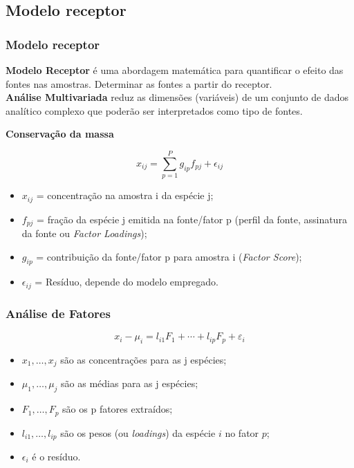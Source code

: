 \subsection{Modelo receptor}
\begin{frame}
  \frametitle{Modelo receptor}
  \textbf{Modelo Receptor} é uma abordagem matemática para quantificar o efeito das fontes 
  nas amostras. Determinar as fontes a partir do receptor. \\
  \textbf{Análise Multivariada} reduz as dimensões (variáveis) de um conjunto de dados 
   analítico complexo que poderão ser interpretados como tipo de fontes. 
   \begin{center}
   	\textbf{Conservação da massa}
   \end{center}
     \begin{equation*}
     x_{ij} = \sum_{p=1}^{P} g_{ip}f_{pj} + \epsilon_{ij}
     \end{equation*} 
     \begin{footnotesize}
    
     \begin{itemize}
     	\item $x_{ij}$ = concentração na amostra i da espécie j;
     	\item $f_{pj}$ = fração da espécie j emitida na fonte/fator p 
     	(perfil da fonte, assinatura da fonte ou \textit{Factor Loadings}); 
     	\item $g_{ip}$ = contribuição da fonte/fator p para amostra i (\textit{Factor Score});
     	\item $\epsilon_{ij}$ = Resíduo, depende do modelo empregado.
     \end{itemize}
         \end{footnotesize}
\end{frame}

\begin{frame}
  \frametitle{Análise de Fatores}
\begin{equation*}
\label{eq:af}
x_i-\mu_i = l_{i1} F_1 + \cdots + l_{ip} F_p + \varepsilon_i 
\end{equation*}
  \begin{itemize}
  	\item $x_1,\dots,x_j$ são as concentrações para as j espécies;
    \item  $\mu_1,\dots,\mu_j$ são as médias para as j espécies;
    \item $F_1, \dots, F_p$ são os p fatores extraídos;
    \item $l_{i1}, \dots, l_{ip}$ são os pesos (ou \textit{loadings}) da espécie $i$ no fator $p$;
    \item $\epsilon_{i}$ é o resíduo.
   \end{itemize}
\end{frame}

